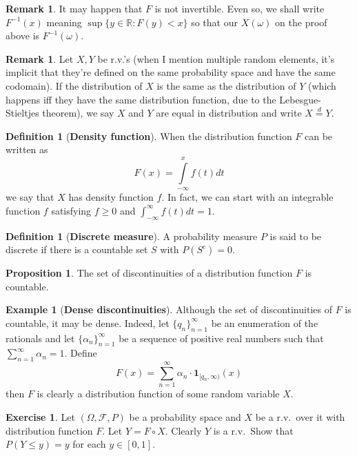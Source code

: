 \documentclass{article}
\theoremstyle{definition}
\newtheorem{proposition}[theorem]{Proposition}
\newtheorem{definition}[theorem]{Definition}
\newtheorem{remark}[theorem]{Remark}
\newtheorem{example}[theorem]{Example}
\newtheorem{exercise}[theorem]{Exercise}
\begin{document}

\begin{remark}
    It may happen that $F$ is not invertible. Even so, we shall write $F^{-1}(x)$ meaning $\sup \{ y \in \mathbb{R} : F(y) < x \}$ so that our $X(\omega)$ on the proof above is $F^{-1}(\omega)$.
\end{remark}

\begin{remark}
    Let $X, Y$ be r.v.'s (when I mention multiple random elements, it's implicit that they're defined on the same probability space and have the same codomain). If the distribution of $X$ is the same as the distribution of $Y$ (which happens iff they have the same distribution function, due to the Lebesgue-Stieltjes theorem), we say $X$ and $Y$ are equal in distribution and write $X \stackrel{d}{=} Y$.
\end{remark}

\begin{definition}[\textbf{Density function}]
    When the distribution function $F$ can be written as
    \[ F(x) = \int\limits_{-\infty}^x f(t) dt \]
    we say that $X$ has density function $f$. In fact, we can start with an integrable function $f$ satisfying $f \geq 0$ and $\int_{-\infty}^{\infty} f(t) dt = 1$.
\end{definition}

\begin{definition}[\textbf{Discrete measure}]
    A probability measure $P$ is said to be discrete if there is a countable set $S$ with $P(S^c) = 0$.
\end{definition}

\begin{proposition}
    The set of discontinuities of a distribution function $F$ is countable.
\end{proposition}

\begin{example}[\textbf{Dense discontinuities}]
    Although the set of discontinuities of $F$ is countable, it may be dense. Indeed, let $\{ q_n \}_{n=1}^\infty$ be an enumeration of the rationals and let $\{ \alpha_n \}_{n=1}^\infty$ be a sequence of positive real numbers such that $\sum_{n=1}^\infty \alpha_n = 1$. Define
    \[ F(x) = \sum\limits_{n=1}^\infty \alpha_n \cdot \mathbf{1}_{[q_n, \infty)}(x) \]
    then $F$ is clearly a distribution function of some random variable $X$.
\end{example}

\begin{exercise}
    Let $(\Omega, \mathcal{F}, P)$ be a probability space and $X$ be a r.v.\ over it with distribution function $F$. Let $Y = F \circ X$. Clearly $Y$ is a r.v.\ Show that $P(Y \leq y) = y$ for each $y \in [0,1]$.
\end{exercise}
\end{document}
